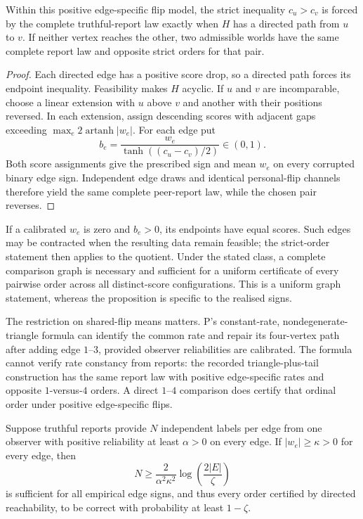 \documentclass{article}
\begin{document}
\begin{proposition}
Within this positive edge-specific flip model, the strict inequality \(c_u>c_v\) is forced by the
complete truthful-report law exactly when \(H\) has a directed path from \(u\) to \(v\). If neither
vertex reaches the other, two admissible worlds have the same complete report law and opposite strict
orders for that pair. %
\end{proposition}

\begin{proof}
Each directed edge has a positive score drop, so a directed path forces its endpoint inequality.
Feasibility makes \(H\) acyclic. If \(u\) and \(v\) are incomparable, choose a linear extension with
\(u\) above \(v\) and another with their positions reversed. In each extension, assign descending scores
with adjacent gaps exceeding \(\max_e 2\operatorname{artanh}|w_e|\). For each edge put
\[
b_e=\frac{w_e}{\tanh((c_u-c_v)/2)}\in(0,1).
\]
Both score assignments give the prescribed sign and mean \(w_e\) on every corrupted binary edge sign.
Independent edge draws and identical personal-flip channels therefore yield the same complete peer-report
law, while the chosen pair reverses. %
\end{proof}

If a calibrated \(w_e\) is zero and \(b_e>0\), its endpoints have equal scores. Such edges may be
contracted when the resulting data remain feasible; the strict-order statement then applies to the
quotient. Under the stated class, a complete comparison graph is necessary and sufficient for a uniform
certificate of every pairwise order across all distinct-score configurations. This is a uniform graph
statement, whereas the proposition is specific to the realised signs. %

The restriction on shared-flip means matters. P's constant-rate, nondegenerate-triangle formula can
identify the common rate and repair its four-vertex path after adding edge \(1\)--\(3\), provided
observer reliabilities are calibrated. The formula cannot verify rate constancy from reports: the
recorded triangle-plus-tail construction has the same report law with positive edge-specific rates and
opposite \(1\)-versus-\(4\) orders. A direct \(1\)--\(4\) comparison does certify that ordinal order
under positive edge-specific flips. %

\begin{proposition}
Suppose truthful reports provide \(N\) independent labels per edge from one observer with positive
reliability at least \(\alpha>0\) on every edge. If \(|w_e|\ge\kappa>0\) for every edge, then
\[
N\ge\frac{2}{\alpha^2\kappa^2}
\log\!\left(\frac{2|E|}{\zeta}\right)
\]
is sufficient for all empirical edge signs, and thus every order certified by directed reachability, to
be correct with probability at least \(1-\zeta\). %
\end{proposition}
\end{document}
